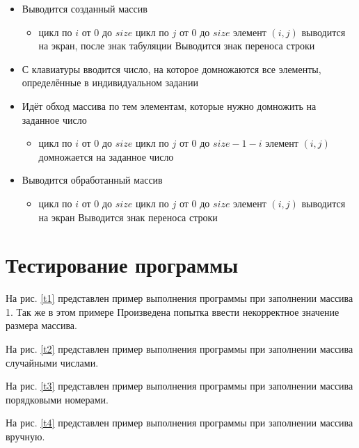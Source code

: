 \documentclass[12pt,a4paper]{article}%
\begin{document}
\begin{itemize}
		\item Выводится созданный массив
		\begin{itemize}
			\item цикл по $i$ от 0 до $size$
			\subitem цикл по $j$ от 0 до $size$
			\subsubitem элемент $ (i,j) $ выводится на экран, после знак табуляции
			\subitem Выводится знак переноса строки
		\end{itemize}
		
		\item С клавиатуры вводится число, на которое домножаются все элементы, определённые в индивидуальном задании
		
		\item Идёт обход массива по тем элементам, которые нужно домножить на заданное число
		
		\begin{itemize}
			\item цикл по $i$ от 0 до $size$
			\subitem цикл по $j$ от 0 до $size - 1 - i$
			\subsubitem элемент $ (i,j) $ домножается на заданное число
		\end{itemize}
		
		\item Выводится обработанный массив
		\begin{itemize}
			\item цикл по $i$ от 0 до $size$
			\subitem цикл по $j$ от 0 до $size$
			\subsubitem элемент $ (i,j) $ выводится на экран
			\subitem Выводится знак переноса строки
		\end{itemize}
		
	\end{itemize}
\newpage
	
	\section*{Тестирование программы}
	
	На рис. \ref{t1} представлен пример выполнения программы при заполнении массива 1. Так же в этом примере Произведена попытка ввести некорректное значение размера массива.
	
	На рис. \ref{t2} представлен пример выполнения программы при заполнении массива случайными числами.
	
	
	На рис. \ref{t3} представлен пример выполнения программы при заполнении массива порядковыми номерами.
	
	На рис. \ref{t4} представлен пример выполнения программы при заполнении массива вручную.
	
\end{document}
